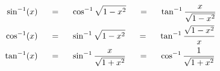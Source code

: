\begin{align*}
\hspace{20mm} \sin^{-1}(x) \hspace{5mm} &= \hspace{5mm} \cos^{-1}\sqrt{1-x^2} \hspace{5mm} = \hspace{5mm}  \tan^{-1}\frac{x}{\sqrt{1-x^2}}\\
\hspace{20mm} \cos^{-1}(x) \hspace{5mm} &= \hspace{5mm} \sin^{-1}\sqrt{1-x^2} \hspace{5mm} = \hspace{5mm}  \tan^{-1}\frac{\sqrt{1-x^2}}{x}\\
\hspace{20mm} \tan^{-1}(x) \hspace{5mm} &= \hspace{5mm} \sin^{-1}\frac{x}{\sqrt{1+x^2}} \hspace{5mm} = \hspace{5mm}  \cos^{-1}\frac{1}{\sqrt{1+x^2}}
\end{align*}

